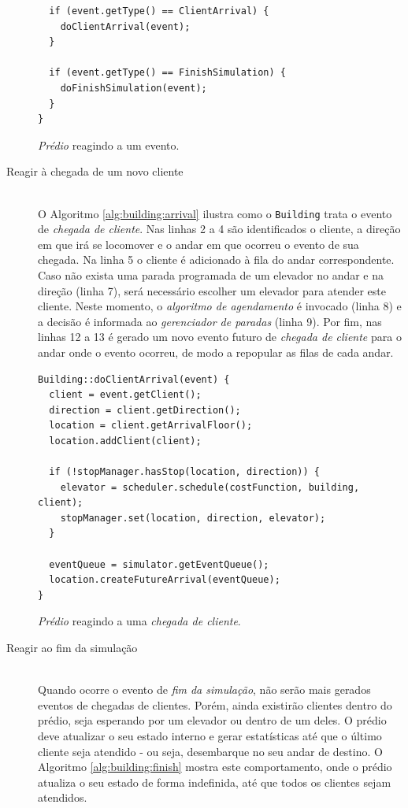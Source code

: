 \begin{description}
\begin{algorithm}[htb!]
\begin{verbatim}
  if (event.getType() == ClientArrival) {
    doClientArrival(event);
  }

  if (event.getType() == FinishSimulation) {
    doFinishSimulation(event);
  }
}
        \end{verbatim}
      \caption{\textit{Prédio} reagindo a um evento.}
      \label{alg:building:notify}
    \end{algorithm}

  \item[Reagir à chegada de um novo cliente] \hfill \\
    O Algoritmo \ref{alg:building:arrival} ilustra como o \texttt{Building}
    trata o evento de \textit{chegada de cliente}. Nas linhas 2 a 4 são
    identificados o cliente, a direção em que irá se locomover e o andar em que
    ocorreu o evento de sua chegada. Na linha 5 o cliente é adicionado à fila do
    andar correspondente. Caso não exista uma parada programada de um elevador
    no andar e na direção (linha 7), será necessário escolher um elevador para
    atender este cliente. Neste momento, o \textit{algoritmo de agendamento} é
    invocado (linha 8) e a decisão é informada ao \textit{gerenciador de
    paradas} (linha 9). Por fim, nas linhas 12 a 13 é gerado um novo evento
    futuro de \textit{chegada de cliente} para o andar onde o evento ocorreu, de
    modo a repopular as filas de cada andar.

    \begin{algorithm}[htb!]
      \centering
        \begin{verbatim}
Building::doClientArrival(event) {
  client = event.getClient();
  direction = client.getDirection();
  location = client.getArrivalFloor();
  location.addClient(client);

  if (!stopManager.hasStop(location, direction)) {
    elevator = scheduler.schedule(costFunction, building, client);
    stopManager.set(location, direction, elevator);
  }

  eventQueue = simulator.getEventQueue();
  location.createFutureArrival(eventQueue);
}
        \end{verbatim}
      \caption{\textit{Prédio} reagindo a uma \textit{chegada de cliente}.}
      \label{alg:building:arrival}
    \end{algorithm}

  \item[Reagir ao fim da simulação] \hfill \\
    Quando ocorre o evento de \textit{fim da simulação}, não serão mais gerados
    eventos de chegadas de clientes. Porém, ainda existirão clientes dentro do
    prédio, seja esperando por um elevador ou dentro de um deles. O prédio deve
    atualizar o seu estado interno e gerar estatísticas até que o último cliente
    seja atendido - ou seja, desembarque no seu andar de destino. O Algoritmo
    \ref{alg:building:finish} mostra este comportamento, onde o prédio atualiza
    o seu estado de forma indefinida, até que todos os clientes sejam atendidos.


\end{description}
